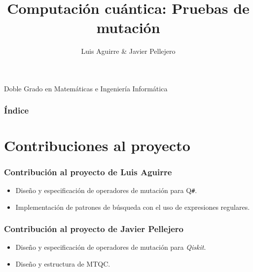 \documentclass{beamer}
\title{Computación cuántica: Pruebas de mutación}
\author{Luis Aguirre \& Javier Pellejero}
\institute[UCM]{Universidad Complutense de Madrid\\ Facultad de Informática}
\newcommand{\qsh}{\textsf{Q}\texttt{\#}} %
\begin{document}
\begin{frame}
	\titlepage
	\begin{center} Doble Grado en Matemáticas e Ingeniería Informática\end{center}
\end{frame}

\begin{frame}
\frametitle{Índice}
	\tableofcontents
\end{frame}

\section{Contribuciones al proyecto}

\begin{frame}
	\frametitle{Contribución al proyecto de Luis Aguirre}
	\begin{itemize}
		\item Diseño y especificación de operadores de mutación para \qsh.
		\item Implementación de patrones de búsqueda con el uso de expresiones regulares.
	\end{itemize}
\end{frame}

\begin{frame}
	\frametitle{Contribución al proyecto de Javier Pellejero}
	\begin{itemize}
		\item Diseño y especificación de operadores de mutación para \textit{Qiskit}.
		\item Diseño y estructura de MTQC.
	\end{itemize}
\end{frame}
\end{document}
